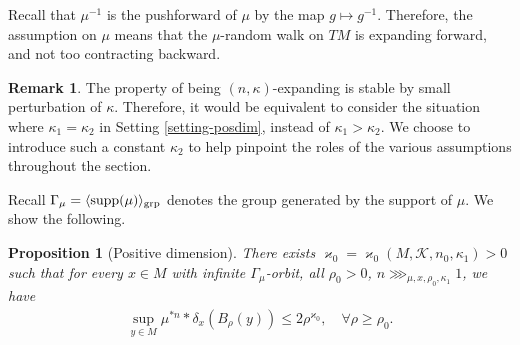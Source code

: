\documentclass[11pt, leqno, fleqn]{amsart}
\def\cU{\mathfrak U}
\newcommand{\cK}{{\mathcal K}}
\newcommand{\aryst}{\begin{eqnarray*}}
\newcommand{\earyst}{\end{eqnarray*}}
\newtheorem{prop}[thm]{\bf Proposition}
\theoremstyle{definition}
\newtheorem{rema}[thm]{\bf Remark}
\theoremstyle{definition}
\def\supp{{\rm supp}}
\newcommand{\Diff}{{\rm Diff}}
\begin{document}
Recall that $\mu^{-1}$ is the pushforward of $\mu$ by the map $g\mapsto g^{-1}$. 
Therefore, the assumption on $\mu$ means that the $\mu$-random walk on $TM$ is expanding forward, and not too contracting backward.

 
  \begin{rema} 
The property of being $(n,\kappa)$-expanding  is stable by small perturbation of $\kappa$. Therefore, it would be  equivalent to consider the situation where $\kappa_{1}=\kappa_{2}$ in Setting \ref{setting-posdim},  instead of $\kappa_{1}>\kappa_{2}$. We choose to introduce such a constant $\kappa_{2}$ to help pinpoint the roles of the various assumptions  throughout the section. 
  \end{rema}



 Recall $\Gamma_{\mu}=\langle \supp (\mu) \rangle_{\text{grp}}$ denotes the group generated by the support of $\mu$. We show the following.




 \begin{prop}[Positive dimension] \label{prop step I gen} 
  There exists $\varkappa_{0}=\varkappa_{0}(M, \cK, n_{0},\kappa_{1})>0$ such that for every $x \in M$ with infinite $\Gamma_{\mu}$-orbit, all $\rho_0 >0$,  $n \ggg_{\mu, x, \rho_{0}, \kappa_{1}} 1$, we have
\aryst
  \sup_{y \in M} \mu^{* n} * \delta_{x}(B_{\rho}(y)) \leq 2 \rho^{\varkappa_{0}}, \quad \forall \rho \geq \rho_0.
\earyst
  \end{prop}
  
  

  
  
\end{document}
